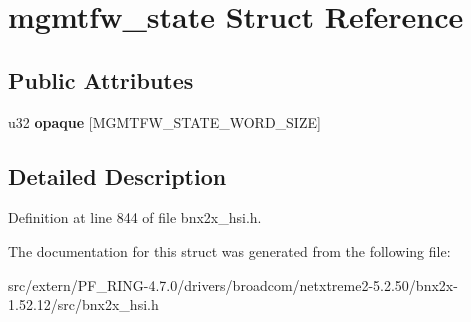 \hypertarget{structmgmtfw__state}{
\section{mgmtfw\_\-state Struct Reference}
\label{structmgmtfw__state}
}
\subsection*{Public Attributes}
\begin{DoxyCompactItemize}
\item 
\hypertarget{structmgmtfw__state_adcd3f593438fecc175b6ed145e1101ca}{
u32 {\bfseries opaque} \mbox{[}MGMTFW\_\-STATE\_\-WORD\_\-SIZE\mbox{]}}
\label{structmgmtfw__state_adcd3f593438fecc175b6ed145e1101ca}

\end{DoxyCompactItemize}


\subsection{Detailed Description}


Definition at line 844 of file bnx2x\_\-hsi.h.



The documentation for this struct was generated from the following file:\begin{DoxyCompactItemize}
\item 
src/extern/PF\_\-RING-\/4.7.0/drivers/broadcom/netxtreme2-\/5.2.50/bnx2x-\/1.52.12/src/bnx2x\_\-hsi.h\end{DoxyCompactItemize}
